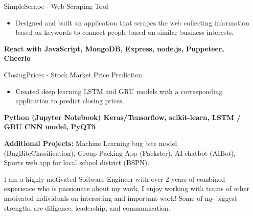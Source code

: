 \documentclass[10pt,a4paper,ragged2e,withhyper]{altacv}
\begin{document}
\begin{paracol}{2}
\divider

\large{SimpleScrape - Web Scraping Tool}
\begin{itemize}
\small\item {Designed and built an application that scrapes the web collecting information based on keywords  to connect people based on similar business interests.}
\end{itemize}
\small\textbf {React with JavaScript, MongoDB, Express, node.js, Puppeteer, Cheerio}

\divider

\large{ClosingPrices - Stock Market Price Prediction}
\begin{itemize}
\small\item {Created deep learning LSTM and GRU models with a corresponding application to predict closing prices. }
\end{itemize}
\small\textbf {Python (Jupyter Notebook) Keras/Tensorflow, scikit-learn, LSTM / GRU CNN model, PyQT5}

\divider

\textbf {Additional Projects:} Machine Learning bug bite model (BugBiteClassification), Group Packing App (Packster), AI chatbot (AIBot), Sports web app for local school district (BSPN). 

\medskip

\newpage

\switchcolumn


{I am a highly motivated Software Engineer with over 2 years of combined experience who is passionate about my work. I enjoy working with teams of other motivated individuals on interesting and important work! Some of my biggest strengths are diligence, leadership, and communication.}

\divider




 \break
{} 


\divider\smallskip



\end{paracol}
\end{document}
